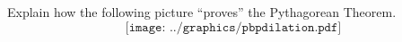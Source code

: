 %



\begin{prob}
Explain how the following picture ``proves'' the Pythagorean Theorem.
\[
\texttt{[image: ../graphics/pbpdilation.pdf]}
\]
\end{prob}

